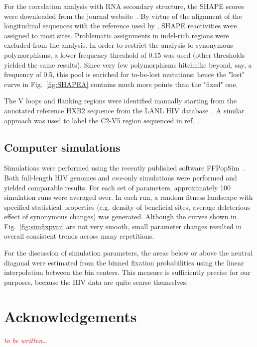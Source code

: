\documentclass[rmp, twocolumn]{revtex4}
\newcommand{\comment}[1]{\textit{\textcolor{red}{#1}}}
\newcommand{\env}{\textit{env}}
\newcommand{\FIG}[1]{Fig.~\ref{fig:#1}}
\begin{document}
For the correlation analysis with RNA secondary structure, the SHAPE scores were
downloaded from the journal website~\citep{watts_architecture_2009}. By virtue
of the alignment of the longitudinal sequences with the reference used by
\citet{watts_architecture_2009}, SHAPE reactivities were assigned to most sites.
Problematic assignments in indel-rich regions were excluded from the analysis.
In order to restrict the analysis to synonymous polymorphisms, a lower frequency
threshold of 0.15 was used (other thresholds yielded the same results). Since
very few polymorphisms hitchhike beyond, say, a frequency of 0.5, this pool is
enriched for to-be-lost mutations; hence the "lost" curve in \FIG{SHAPEA}
contains much more points than the "fixed" one.

The V loops and flanking regions were identified manually starting from the
annotated reference HXB2 sequence from the LANL HIV database~\citep{LANL2012}. A
similar approach was used to label the C2-V5 region sequenced in
ref.~\citep{shankarappa_consistent_1999}.

\subsection{Computer simulations}
Simulations were performed using the recently published software
FFPopSim~\citep{zanini_ffpopsim:_2012}. Both full-length HIV genomes and
\env{}-only simulations were performed and yielded comparable results. For each
set of parameters, approximately 100 simulation runs were averaged over. In each
run, a random fitness landscape with specified statistical properties (e.g.
density of beneficial sites, average deleterious effect of synonymous changes) was generated.
Although the curves shown in \FIG{simfixpvar} are not very smooth, small
parameter changes resulted in overall consistent trends across many repetitions.

For the discussion of simulation parameters, the areas below or above the neutral
diagonal were estimated from the binned fixation probabilities using the linear
interpolation between the bin centers. This measure is sufficiently precise for
our purposes, because the HIV data are quite scarse themselves.

\section*{Acknowledgements}
\comment{to be written\dots}




\end{document}

